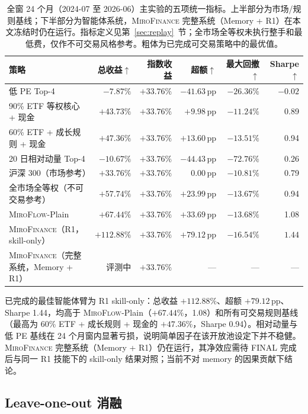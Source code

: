 \documentclass[11pt]{article}
\newcommand{\miroflow}{\textsc{MiroFlow}}
\newcommand{\memskill}{\textsc{MiroFinance}}
\newcommand{\pp}{\,\mathrm{pp}}
\begin{document}
\begin{table}[!t]
\centering
\caption{全窗 24 个月（2024-07 至 2026-06）主实验的五项统一指标。上半部分为市场/规则基线；下半部分为智能体系统，\memskill{} 完整系统（Memory + R1）在本文冻结时仍在运行。指标定义见第~\ref{sec:replay}~节；全市场全等权未执行整手和最低费，仅作不可交易风格参考。粗体为已完成可交易策略中的最优值。}
\label{tab:main-results}
\small
\begin{tabular}{@{}lrrrrr@{}}
\toprule
\textbf{策略} & \textbf{总收益}$\uparrow$ & \textbf{指数收益} &
\textbf{超额}$\uparrow$ & \textbf{最大回撤}$\uparrow$ & \textbf{Sharpe}$\uparrow$ \\
\midrule
低 PE Top-4 & $-7.87\%$ & $+33.76\%$ & $-41.63\pp$ & $-26.36\%$ & $-0.02$ \\
90\% ETF 等权核心 + 现金 & $+43.73\%$ & $+33.76\%$ & $+9.98\pp$ & $\mathbf{-11.24\%}$ & 0.89 \\
60\% ETF + 成长规则 + 现金 & $+47.36\%$ & $+33.76\%$ & $+13.60\pp$ & $-13.51\%$ & 0.94 \\
20 日相对动量 Top-4 & $-10.67\%$ & $+33.76\%$ & $-44.43\pp$ & $-72.76\%$ & 0.26 \\
\midrule
沪深 300（市场参考） & $+33.76\%$ & $+33.76\%$ & $0.00\pp$ & $-10.81\%$ & 0.79 \\
全市场全等权（不可交易参考） & $+57.74\%$ & $+33.76\%$ & $+23.99\pp$ & $-13.67\%$ & 0.94 \\
\midrule
\miroflow{}-Plain & $+67.44\%$ & $+33.76\%$ & $+33.69\pp$ & $-13.68\%$ & 1.08 \\
\memskill{}（R1，skill-only） & $\mathbf{+112.88\%}$ & $+33.76\%$ & $\mathbf{+79.12\pp}$ & $-16.54\%$ & $\mathbf{1.44}$ \\
\memskill{}（完整系统，Memory + R1） & 评测中 & $+33.76\%$ & --- & --- & --- \\
\bottomrule
\end{tabular}
\end{table}

已完成的最佳智能体臂为 R1 skill-only：总收益 $+112.88\%$、超额 $+79.12\pp$、Sharpe 1.44，均高于 \miroflow{}-Plain（$+67.44\%$，1.08）和所有可交易规则基线（最高为 60\% ETF + 成长规则 + 现金的 $+47.36\%$，Sharpe 0.94）。相对动量与低 PE 基线在 24 个月窗内显著亏损，说明简单因子在该开放池设定下并不稳健。\memskill{} 完整系统（Memory + R1）仍在运行，其净效应需待 FINAL 完成后与同一 R1 技能下的 skill-only 结果对照；当前不对 memory 的因果贡献下结论。

\subsection{Leave-one-out 消融}
\label{sec:ablation-matrix}
\end{document}
